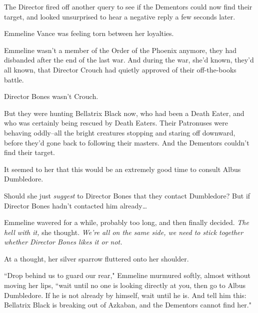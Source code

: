 The Director fired off another query to see if the Dementors could now find their target, and looked unsurprised to hear a negative reply a few seconds later.

Emmeline Vance was feeling torn between her loyalties.

Emmeline wasn't a member of the Order of the Phoenix anymore, they had disbanded after the end of the last war. And during the war, she'd known, they'd all known, that Director Crouch had quietly approved of their off-the-books battle.

Director Bones wasn't Crouch.

But they were hunting Bellatrix Black now, who had been a Death Eater, and who was certainly being rescued by Death Eaters. Their Patronuses were behaving oddly\---all the bright creatures stopping and staring off downward, before they'd gone back to following their masters. And the Dementors couldn't find their target.

It seemed to her that this would be an extremely good time to consult Albus Dumbledore.

Should she just \emph{suggest} to Director Bones that they contact Dumbledore? But if Director Bones hadn't contacted him already{\ldots}

Emmeline wavered for a while, probably too long, and then finally decided. \emph{The hell with it,} she thought. \emph{We're all on the same side, we need to stick together whether Director Bones likes it or not.}

At a thought, her silver sparrow fluttered onto her shoulder.

``Drop behind us to guard our rear," Emmeline murmured softly, almost without moving her lips, ``wait until no one is looking directly at you, then go to Albus Dumbledore. If he is not already by himself, wait until he is. And tell him this: Bellatrix Black is breaking out of Azkaban, and the Dementors cannot find her."

